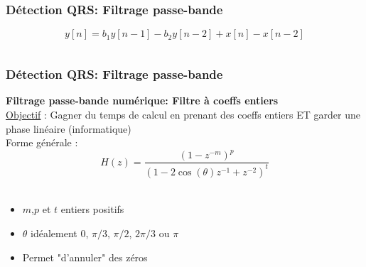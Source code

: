 \documentclass{beamer}
\begin{document}
\begin{frame}
\frametitle{Détection QRS: Filtrage passe-bande}
 \[y[n] = b_1 y[n-1] - b_2 y[n-2] + x[n] - x[n-2] \]
\begin{columns}[T]
\column{60mm}
\begin{center}
\end{center}
\column{60mm}
\begin{center}
\end{center}
\begin{center}
\begin{tikzpicture}

\end{tikzpicture}
\end{center}
\end{columns}
\end{frame}

\begin{frame}
\frametitle{Détection QRS: Filtrage passe-bande}
 \textbf{Filtrage passe-bande numérique: Filtre à coeffs entiers}\\
 \vspace{0.2cm}
 \underline{Objectif} : Gagner du temps de calcul en prenant des coeffs entiers ET garder une phase linéaire (informatique) \\
 \vspace{0.3cm}
 Forme générale : 
 \[ H(z) = \frac{(1 -z^{-m})^p}{(1 - 2 \cos(\theta)z^{-1} + z^{-2})^t} \] \\
 \vspace{0.2cm}
 \begin{itemize}
 \item  $m$,$p$ et $t$ entiers positifs
 \item $\theta$ idéalement 0, $\pi/3$, $\pi/2$, $2\pi/3$ ou $\pi$
 \item Permet "d'annuler" des zéros
 \end{itemize}
\end{frame}
\end{document}
